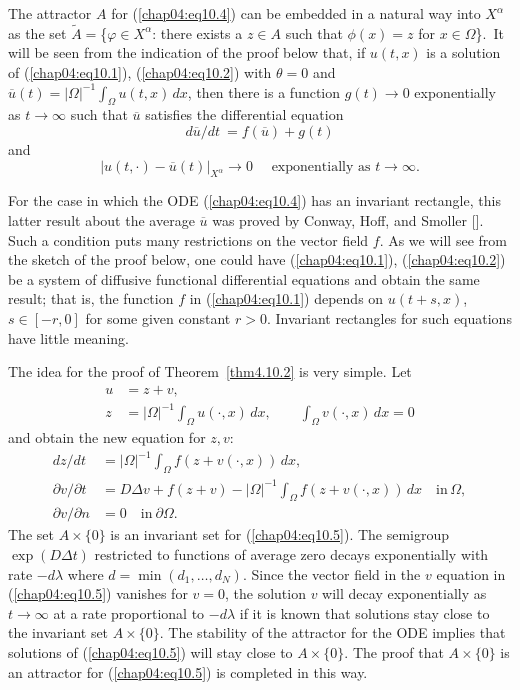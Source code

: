 \documentclass{surv-l}
\theoremstyle{plain}
\theoremstyle{definition}
\numberwithin{equation}{section}
\numberwithin{figure}{chapter}
\begin{document}
The attractor $A$ for (\ref{chap04:eq10.4}) can be embedded in a natural way into $X^{\alpha}$ as the set $\tilde{A}=$\{$\varphi \in X^{\alpha}$: there exists a $z\in A$ such that $\phi(x)=z$ for $ x\in\Omega$\}.\, It will be seen from the indication of the proof below that, if $u(t, x)$ is a solution of (\ref{chap04:eq10.1}), (\ref{chap04:eq10.2}) with $\theta=0$ and $\overline{u}(t)=|\Omega|^{-1}\int_{\Omega}u(t, x)\, dx$, then there is a function $g(t)\rightarrow 0$ exponentially as $ t\rightarrow\infty$ such that $\overline{u}$ satisfies the differential equation
\begin{equation*}
d{\overline{u}}/dt\ =f(\overline{u})+g(t)
\end{equation*}
and
\begin{equation*}
|u(t, \cdot)-\overline{u}(t)|_{X^{\alpha}}\rightarrow 0\quad \text{ exponentially as } t\rightarrow\infty.
\end{equation*}

For the case in which the ODE (\ref{chap04:eq10.4}) has an invariant rectangle, this latter result about the average $\overline{u}$ was proved by Conway, Hoff, and Smoller [\citeyear{1978chs}]. Such a condition puts many restrictions on the vector field $f$. As we will see from the sketch of the proof below, one could have (\ref{chap04:eq10.1}), (\ref{chap04:eq10.2}) be a system of diffusive functional differential equations and obtain the same result; that is, the function $f$ in (\ref{chap04:eq10.1}) depends on $u(t+s, x)$, $s\in[-r, 0]$ for some given constant $r>0$. Invariant rectangles for such equations have little meaning.

The idea for the proof of Theorem~\ref{thm4.10.2} is very simple. Let
\begin{align*}
u&=z+v,\\
z&=|\Omega|^{-1}\int_{\Omega}u(\cdot, x)\,dx,\quad\quad \int_{\Omega}v(\cdot, x)\,dx=0
\end{align*}
and obtain the new equation for $z, v$:
\begin{equation}\label{chap04:eq10.5}
\begin{split}
dz/dt&=|\Omega|^{-1}\int_{\Omega}f(z+v(\cdot, x))\,dx,\\
\partial v/\partial t&=D\Delta v+f(z+v)-|\Omega|^{-1}\int_{\Omega}f(z+v(\cdot, x))\,dx\quad \mathrm{in}\, \Omega,\\
\partial v/\partial n&=0\quad \mathrm{in}\ \partial\Omega.
\end{split}
\end{equation}
The set $A\times\{0\}$ is an invariant set for (\ref{chap04:eq10.5}). The semigroup $\exp(D\Delta t)$ restricted to functions of average zero decays exponentially with rate $-d\lambda$ where $d=\min(d_{1}, \ldots, d_{N})$. Since the vector field in the $v$ equation in (\ref{chap04:eq10.5}) vanishes for $v=0$, the solution $v$ will decay exponentially as $ t\rightarrow\infty$ at a rate proportional to $-d\lambda$ if it is known that solutions stay close to the invariant set $A\times\{0\}$. The stability of the attractor for the ODE implies that solutions of (\ref{chap04:eq10.5}) will stay close to $A\times\{0\}$. The proof that $A\times\{0\}$ is an attractor for (\ref{chap04:eq10.5}) is completed in this way.
\end{document}
